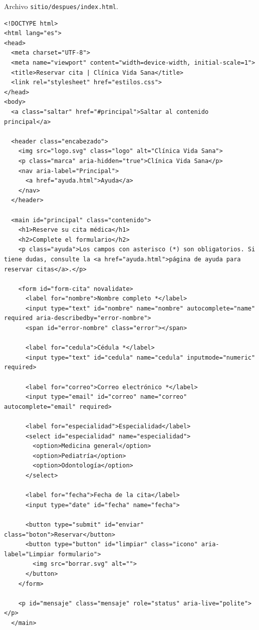 \documentclass[10pt,letterpaper,onecolumn]{IEEEtran}
\begin{document}
Archivo \texttt{sitio/\allowbreak{}\allowbreak{}despues/\allowbreak{}\allowbreak{}index.\allowbreak{}\allowbreak{}html}.

\begin{lstlisting}
<!DOCTYPE html>
<html lang="es">
<head>
  <meta charset="UTF-8">
  <meta name="viewport" content="width=device-width, initial-scale=1">
  <title>Reservar cita | Clínica Vida Sana</title>
  <link rel="stylesheet" href="estilos.css">
</head>
<body>
  <a class="saltar" href="#principal">Saltar al contenido principal</a>

  <header class="encabezado">
    <img src="logo.svg" class="logo" alt="Clínica Vida Sana">
    <p class="marca" aria-hidden="true">Clínica Vida Sana</p>
    <nav aria-label="Principal">
      <a href="ayuda.html">Ayuda</a>
    </nav>
  </header>

  <main id="principal" class="contenido">
    <h1>Reserve su cita médica</h1>
    <h2>Complete el formulario</h2>
    <p class="ayuda">Los campos con asterisco (*) son obligatorios. Si tiene dudas, consulte la <a href="ayuda.html">página de ayuda para reservar citas</a>.</p>

    <form id="form-cita" novalidate>
      <label for="nombre">Nombre completo *</label>
      <input type="text" id="nombre" name="nombre" autocomplete="name" required aria-describedby="error-nombre">
      <span id="error-nombre" class="error"></span>

      <label for="cedula">Cédula *</label>
      <input type="text" id="cedula" name="cedula" inputmode="numeric" required>

      <label for="correo">Correo electrónico *</label>
      <input type="email" id="correo" name="correo" autocomplete="email" required>

      <label for="especialidad">Especialidad</label>
      <select id="especialidad" name="especialidad">
        <option>Medicina general</option>
        <option>Pediatría</option>
        <option>Odontología</option>
      </select>

      <label for="fecha">Fecha de la cita</label>
      <input type="date" id="fecha" name="fecha">

      <button type="submit" id="enviar" class="boton">Reservar</button>
      <button type="button" id="limpiar" class="icono" aria-label="Limpiar formulario">
        <img src="borrar.svg" alt="">
      </button>
    </form>

    <p id="mensaje" class="mensaje" role="status" aria-live="polite"></p>
  </main>


\end{lstlisting}
\end{document}
